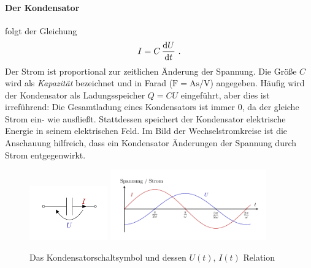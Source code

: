 \paragraph*{Der Kondensator}
folgt der Gleichung
\begin{equation}\label{eq:C}
    I = C\,\dv{U}{t} ~.
\end{equation}
Der Strom ist proportional zur zeitlichen Änderung der Spannung. Die Größe $C$ wird als \emph{Kapazität} bezeichnet und
in Farad ($\si{\farad} = \si{\ampere\second}/\si{\volt}$) angegeben. Häufig wird der Kondensator als Ladungsspeicher $Q
= CU$ eingeführt, aber dies ist irreführend: Die Gesamtladung eines Kondensators ist immer 0, da der gleiche Strom ein-
wie ausfließt. Stattdessen speichert der Kondensator elektrische Energie in seinem elektrischen Feld. Im Bild der
Wechselstromkreise ist die Anschauung hilfreich, dass ein Kondensator Änderungen der Spannung durch Strom entgegenwirkt.
\begin{figure}[H]
    \centering
    \includegraphics[width=0.3\textwidth]{kBC.pdf}
    \includegraphics[width=0.6\textwidth]{kPC.pdf}
    \caption{Das Kondensatorschaltsymbol und dessen $U(t),\, I(t)$ Relation}
\end{figure}

